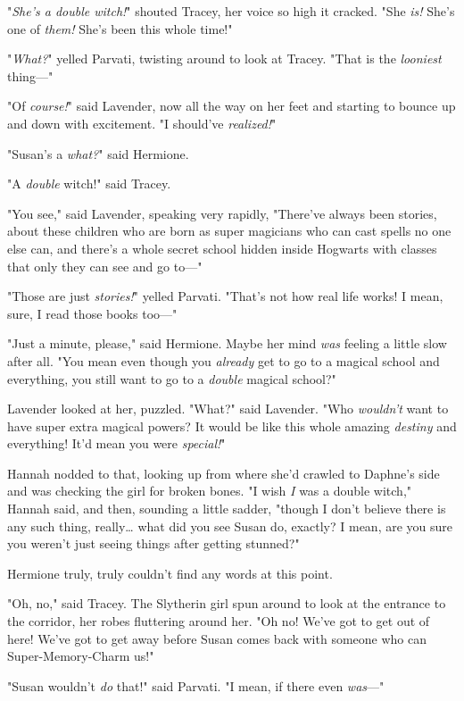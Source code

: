 "\emph{She's a double witch!}" shouted Tracey, her voice so high it cracked.
"She \emph{is!} She's one of \emph{them!} She's been this whole time!"

"\emph{What?}" yelled Parvati, twisting around to look at Tracey. "That is the
\emph{looniest} thing---"

"Of \emph{course!}" said Lavender, now all the way on her feet and starting to
bounce up and down with excitement. "I should've \emph{realized!}"

"Susan's a \emph{what?}" said Hermione.

"A \emph{double} witch!" said Tracey.

"You see," said Lavender, speaking very rapidly, "There've always been stories,
about these children who are born as super magicians who can cast spells no one
else can, and there's a whole secret school hidden inside Hogwarts with classes
that only they can see and go to---"

"Those are just \emph{stories!}" yelled Parvati. "That's not how real life
works! I mean, sure, I read those books too---"

"Just a minute, please," said Hermione. Maybe her mind \emph{was} feeling a
little slow after all. "You mean even though you \emph{already} get to go to a
magical school and everything, you still want to go to a \emph{double} magical
school?"

Lavender looked at her, puzzled. "What?" said Lavender. "Who \emph{wouldn't}
want to have super extra magical powers? It would be like this whole amazing
\emph{destiny} and everything! It'd mean you were \emph{special!}"

Hannah nodded to that, looking up from where she'd crawled to Daphne's side and
was checking the girl for broken bones. "I wish \emph{I} was a double witch,"
Hannah said, and then, sounding a little sadder, "though I don't believe there
is any such thing, really{\ldots} what did you see Susan do, exactly? I mean,
are you sure you weren't just seeing things after getting stunned?"

Hermione truly, truly couldn't find any words at this point.

"Oh, no," said Tracey. The Slytherin girl spun around to look at the entrance
to the corridor, her robes fluttering around her. "Oh no! We've got to get out
of here! We've got to get away before Susan comes back with someone who can
Super-Memory-Charm us!"

"Susan wouldn't \emph{do} that!" said Parvati. "I mean, if there even
\emph{was}---"

